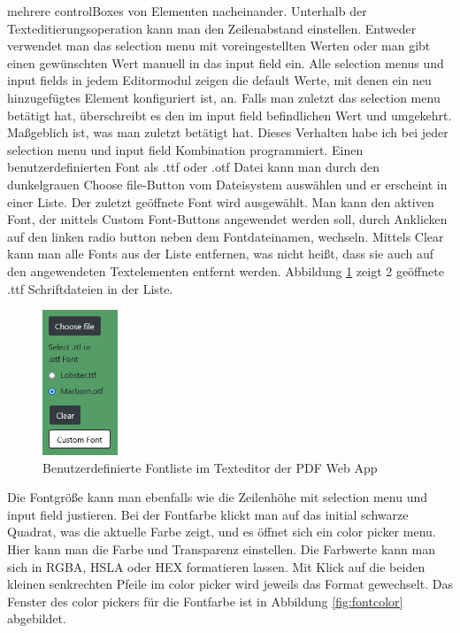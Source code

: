 mehrere controlBoxes von Elementen nacheinander. Unterhalb der Texteditierungsoperation kann man den Zeilenabstand einstellen. Entweder verwendet man das selection menu mit voreingestellten Werten oder man gibt einen gewünschten Wert manuell in das input field ein. Alle selection menus und input fields in jedem Editormodul zeigen die default Werte, mit denen ein neu hinzugefügtes Element konfiguriert ist, an. Falls man zuletzt das selection menu betätigt hat, überschreibt es den im input field befindlichen Wert und umgekehrt. Maßgeblich ist, was man zuletzt betätigt hat. Dieses Verhalten habe ich bei jeder selection menu und input field Kombination programmiert. Einen benutzerdefinierten Font als .ttf oder .otf Datei kann man durch den dunkelgrauen Choose file-Button vom Dateisystem auswählen und er erscheint in einer Liste. Der zuletzt geöffnete Font wird ausgewählt. Man kann den aktiven Font, der mittels Custom Font-Buttons angewendet werden soll, durch Anklicken auf den linken radio button neben dem Fontdateinamen, wechseln. Mittels Clear kann man alle Fonts aus der Liste entfernen, was nicht heißt, dass sie auch auf den angewendeten Textelementen entfernt werden. Abbildung \ref{fig:custom-font} zeigt 2 geöffnete .ttf Schriftdateien in der Liste.

\begin{figure}[!htbp]
	\centering
	\includegraphics[width=0.2\textwidth]{"images/custom-font.png"}
	\caption{Benutzerdefinierte Fontliste im Texteditor der PDF Web App}
	\label{fig:custom-font}
\end{figure}

Die Fontgröße kann man ebenfalls wie die Zeilenhöhe mit selection menu und input field justieren. Bei der Fontfarbe klickt man auf das initial schwarze Quadrat, was die aktuelle Farbe zeigt, und es öffnet sich ein color picker menu. Hier kann man die Farbe und Transparenz einstellen. Die Farbwerte kann man sich in RGBA, HSLA oder HEX formatieren lassen. Mit Klick auf die beiden kleinen senkrechten Pfeile im color picker wird jeweils das Format gewechselt. Das Fenster des color pickers für die Fontfarbe ist in Abbildung \ref{fig:fontcolor} abgebildet. 


